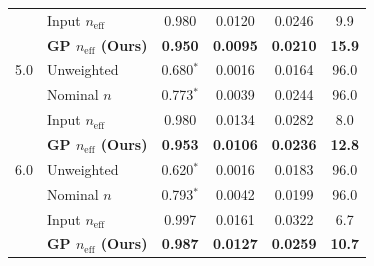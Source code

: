 \begin{table}[!htbp]
{\begin{tabular}{@{}llcccc@{}}
& Input $n_{\mathrm{eff}}$ & 0.980     & 0.0120 & 0.0246 & 9.9 \\
& \textbf{GP $n_{\mathrm{eff}}$ (Ours)} & \textbf{0.950} & \textbf{0.0095} & \textbf{0.0210} & \textbf{15.9} \\
\midrule
5.0 
& Unweighted         & 0.680$^*$ & 0.0016 & 0.0164 & 96.0 \\
& Nominal $n$        & 0.773$^*$ & 0.0039 & 0.0244 & 96.0 \\
& Input $n_{\mathrm{eff}}$ & 0.980     & 0.0134 & 0.0282 & 8.0 \\
& \textbf{GP $n_{\mathrm{eff}}$ (Ours)} & \textbf{0.953} & \textbf{0.0106} & \textbf{0.0236} & \textbf{12.8} \\
\midrule
6.0 
& Unweighted         & 0.620$^*$ & 0.0016 & 0.0183 & 96.0 \\
& Nominal $n$        & 0.793$^*$ & 0.0042 & 0.0199 & 96.0 \\
& Input $n_{\mathrm{eff}}$ & 0.997     & 0.0161 & 0.0322 & 6.7 \\
& \textbf{GP $n_{\mathrm{eff}}$ (Ours)} & \textbf{0.987} & \textbf{0.0127} & \textbf{0.0259} & \textbf{10.7} \\
\bottomrule
\end{tabular}}
\end{table}